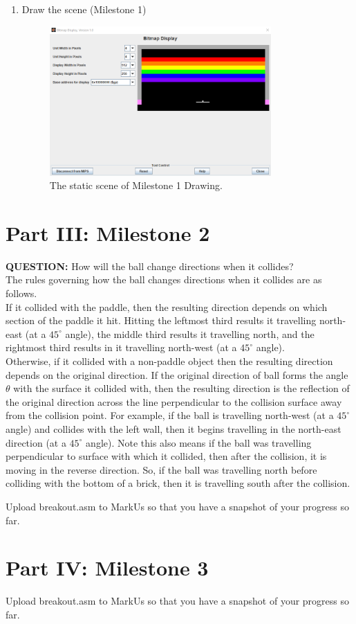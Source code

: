 \documentclass{article}
\begin{document}
\begin{enumerate}
\item Draw the scene (Milestone 1)

\begin{figure}[ht!]
    \centering
    \includegraphics[width=0.8\textwidth]{milestone1_drawing.png}
    \caption{The static scene of Milestone 1 Drawing.}
    \label{f:milestone1_drawing}
\end{figure}

\end{enumerate}

\section{Part III: Milestone 2}

\item \textbf{QUESTION: } How will the ball change directions when it collides? \\[0.4em]
The rules governing how the ball changes directions when it collides are as follows. \\[0.4em]
If it collided with the paddle, then the resulting direction depends on which section of the paddle it hit.
Hitting the leftmost third results it travelling north-east (at a $45^\circ$ angle), the middle third results it travelling north, and the rightmost third results in it travelling north-west (at a $45^\circ$ angle). \\[0.4em]
Otherwise, if it collided with a non-paddle object then the resulting direction depends on the original direction.
If the original direction of ball forms the angle $\theta$ with the surface it collided with, 
then the resulting direction is the reflection of the original direction across the line perpendicular to the collision surface away from the collision point.
For example, if the ball is travelling north-west (at a $45^\circ$ angle) and collides with the left wall, then it begins travelling in the north-east direction (at a $45^\circ$ angle).
Note this also means if the ball was travelling perpendicular to surface with which it collided, then after the collision, it is moving in the reverse direction.
So, if the ball was travelling north before colliding with the bottom of a brick, then it is travelling south after the collision.
\item Upload breakout.asm to MarkUs so that you have a snapshot of your progress so far.

\section{Part IV: Milestone 3}
\item Upload breakout.asm to MarkUs so that you have a snapshot of your progress so far.
\end{document}

